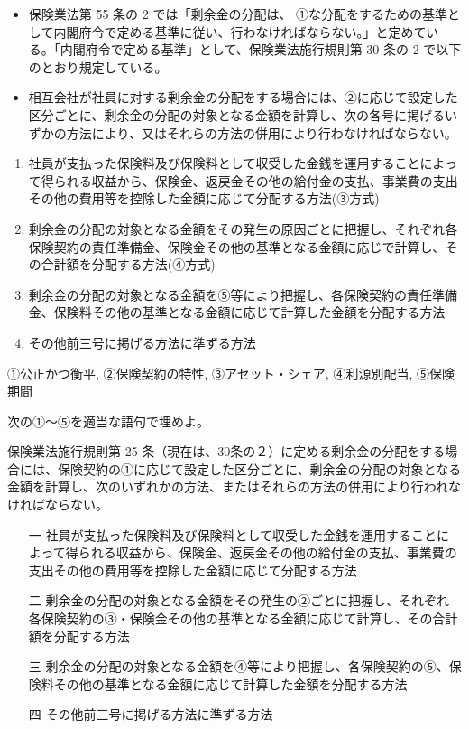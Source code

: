 \documentclass[report,gutter=10mm,fore-edge=10mm,uplatex,dvipdfmx]{jlreq}
\begin{document}
\begin{itemize}
 \item 保険業法第 55 条の 2 では「剰余金の分配は、
 ①な分配をするための基準として内閣府令で定める基準に従い、行わなければならない。」と定めている。「内閣府令で定める基準」として、保険業法施行規則第
 30 条の 2 で以下のとおり規定している。
 \item 相互会社が社員に対する剰余金の分配をする場合には、②に応じて設定した区分ごとに、剰余金の分配の対象となる金額を計算し、次の各号に掲げるいずかの方法により、又はそれらの方法の併用により行わなければならない。
\end{itemize}
\begin{enumerate}
 \item 
 社員が支払った保険料及び保険料として収受した金銭を運用することによって得られる収益から、保険金、返戻金その他の給付金の支払、事業費の支出その他の費用等を控除した金額に応じて分配する方法(③方式)
 \item 
 剰余金の分配の対象となる金額をその発生の原因ごとに把握し、それぞれ各保険契約の責任準備金、保険金その他の基準となる金額に応じで計算し、その合計額を分配する方法(④方式)
 \item 剰余金の分配の対象となる金額を⑤等により把握し、各保険契約の責任準備金、保険料その他の基準となる金額に応じて計算した金額を分配する方法
 \item その他前三号に掲げる方法に準ずる方法
\end{enumerate}


①公正かつ衡平, ②保険契約の特性, ③アセット・シェア, ④利源別配当,
⑤保険期間


次の①～⑤を適当な語句で埋めよ。

保険業法施行規則第 25 条（現在は、30条の２）に定める剰余金の分配をする場合には、保険契約の①に応じて設定した区分ごとに、剰余金の分配の対象となる金額を計算し、次のいずれかの方法、またはそれらの方法の併用により行われなければならない。

\begin{enumerate}
 \item [一 ]
 社員が支払った保険料及び保険料として収受した金銭を運用することによって得られる収益から、保険金、返戻金その他の給付金の支払、事業費の支出その他の費用等を控除した金額に応じて分配する方法
 \item [二 ]
 剰余金の分配の対象となる金額をその発生の②ごとに把握し、それぞれ各保険契約の③・保険金その他の基準となる金額に応じて計算し、その合計額を分配する方法
 \item [三 ]
 剰余金の分配の対象となる金額を④等により把握し、各保険契約の⑤、保険料その他の基準となる金額に応じて計算した金額を分配する方法
 \item  [四 ] その他前三号に掲げる方法に準ずる方法
\end{enumerate}
\end{document}
